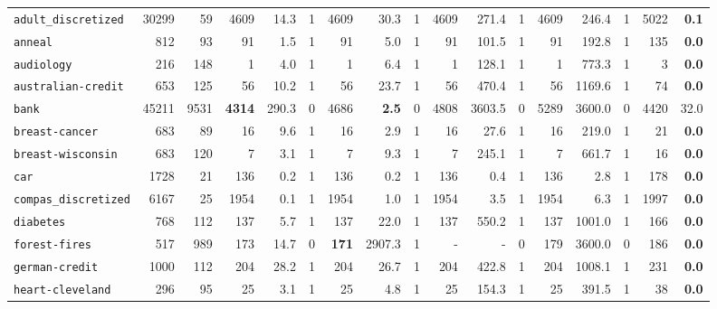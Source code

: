 \begin{tabular}{lccrrrrrrrrrrrrrr}
\texttt{adult\_discretized} & \multicolumn{1}{r}{30299} & \multicolumn{1}{r}{59}  & 4609 & 14.3 & 1 & 4609 & 30.3 & 1 & 4609 & 271.4 & 1 & 4609 & 246.4 & 1 & 5022 & \textbf{0.1}\\
\texttt{anneal} & \multicolumn{1}{r}{812} & \multicolumn{1}{r}{93}  & 91 & 1.5 & 1 & 91 & 5.0 & 1 & 91 & 101.5 & 1 & 91 & 192.8 & 1 & 135 & \textbf{0.0}\\
\texttt{audiology} & \multicolumn{1}{r}{216} & \multicolumn{1}{r}{148}  & 1 & 4.0 & 1 & 1 & 6.4 & 1 & 1 & 128.1 & 1 & 1 & 773.3 & 1 & 3 & \textbf{0.0}\\
\texttt{australian-credit} & \multicolumn{1}{r}{653} & \multicolumn{1}{r}{125}  & 56 & 10.2 & 1 & 56 & 23.7 & 1 & 56 & 470.4 & 1 & 56 & 1169.6 & 1 & 74 & \textbf{0.0}\\
\texttt{bank} & \multicolumn{1}{r}{45211} & \multicolumn{1}{r}{9531}  & \textbf{4314} & 290.3 & 0 & 4686 & \textbf{2.5} & 0 & 4808 & 3603.5 & 0 & 5289 & 3600.0 & 0 & 4420 & 32.0\\
\texttt{breast-cancer} & \multicolumn{1}{r}{683} & \multicolumn{1}{r}{89}  & 16 & 9.6 & 1 & 16 & 2.9 & 1 & 16 & 27.6 & 1 & 16 & 219.0 & 1 & 21 & \textbf{0.0}\\
\texttt{breast-wisconsin} & \multicolumn{1}{r}{683} & \multicolumn{1}{r}{120}  & 7 & 3.1 & 1 & 7 & 9.3 & 1 & 7 & 245.1 & 1 & 7 & 661.7 & 1 & 16 & \textbf{0.0}\\
\texttt{car} & \multicolumn{1}{r}{1728} & \multicolumn{1}{r}{21}  & 136 & 0.2 & 1 & 136 & 0.2 & 1 & 136 & 0.4 & 1 & 136 & 2.8 & 1 & 178 & \textbf{0.0}\\
\texttt{compas\_discretized} & \multicolumn{1}{r}{6167} & \multicolumn{1}{r}{25}  & 1954 & 0.1 & 1 & 1954 & 1.0 & 1 & 1954 & 3.5 & 1 & 1954 & 6.3 & 1 & 1997 & \textbf{0.0}\\
\texttt{diabetes} & \multicolumn{1}{r}{768} & \multicolumn{1}{r}{112}  & 137 & 5.7 & 1 & 137 & 22.0 & 1 & 137 & 550.2 & 1 & 137 & 1001.0 & 1 & 166 & \textbf{0.0}\\
\texttt{forest-fires} & \multicolumn{1}{r}{517} & \multicolumn{1}{r}{989}  & 173 & 14.7 & 0 & \textbf{171} & 2907.3 & 1 & - & - & 0 & 179 & 3600.0 & 0 & 186 & \textbf{0.0}\\
\texttt{german-credit} & \multicolumn{1}{r}{1000} & \multicolumn{1}{r}{112}  & 204 & 28.2 & 1 & 204 & 26.7 & 1 & 204 & 422.8 & 1 & 204 & 1008.1 & 1 & 231 & \textbf{0.0}\\
\texttt{heart-cleveland} & \multicolumn{1}{r}{296} & \multicolumn{1}{r}{95}  & 25 & 3.1 & 1 & 25 & 4.8 & 1 & 25 & 154.3 & 1 & 25 & 391.5 & 1 & 38 & \textbf{0.0}\\

\end{tabular}
